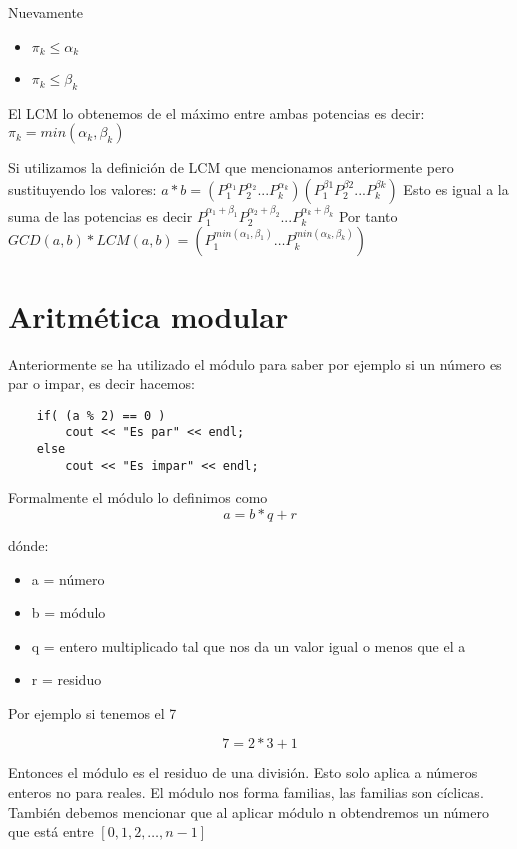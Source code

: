 Nuevamente
\begin{itemize}
    \item {$\pi_{k} \leq \alpha_{k}$}
    \item {$\pi_{k} \leq \beta_{k}$}
\end{itemize}
El LCM lo obtenemos de el máximo entre ambas potencias es decir: \newline
$\pi_{k} = min(\alpha_{k}, \beta_{k})$ \newline

Si utilizamos la definición de LCM que mencionamos anteriormente pero sustituyendo los valores: \newline
$a * b = (P_{1}^{\alpha_{1}}P_{2}^{\alpha_{2}}...P_{k}^{\alpha_{k}})(P_{1}^{\beta{1}}P_{2}^{\beta{2}}...P_{k}^{\beta{k}})$ \newline
Esto es igual a la suma de las potencias es decir 
$P_{1}^{\alpha_{1} + \beta_{1}}P_{2}^{\alpha_{2} + \beta_{2}}...P_{k}^{\alpha_{k} + \beta_{k}}$\newline
Por tanto \newline
$GCD(a, b)*LCM(a, b) = \left ( P_{1}^{ min(\alpha_{1}, \beta_{1})} \dots P_{k}^{ min(\alpha_{k}, \beta_{k}) }  \right )$

\section{Aritmética modular}
Anteriormente se ha utilizado el módulo para saber por ejemplo si un número es par o impar, es decir hacemos:
\begin{lstlisting}
    if( (a % 2) == 0 )
        cout << "Es par" << endl;
    else 
        cout << "Es impar" << endl;
\end{lstlisting}
Formalmente el módulo lo definimos como \newline
\[
    a = b * q + r
\]

dónde:
\begin{itemize}
    \item a = número 
    \item b = módulo 
    \item q = entero multiplicado tal que nos da un valor igual o menos que el a
    \item r = residuo
\end{itemize}

Por ejemplo si tenemos el 7 

\[
    7 = 2 * 3 + 1
\]

Entonces el módulo es el residuo de una división. Esto solo aplica a números enteros no para reales. El módulo nos forma familias, las familias son cíclicas. También debemos mencionar que al aplicar módulo n obtendremos un número que está entre $[ 0, 1, 2, \dots, n - 1 ]$ 

